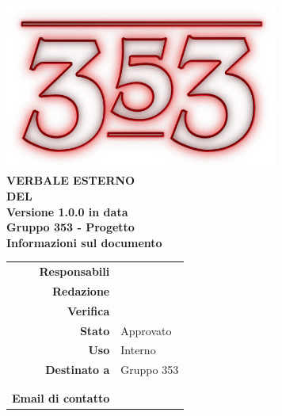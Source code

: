 \documentclass[openany, a4paper, 12pt]{report}
\begin{document}
\begin{titlepage}
	\centering
	\vfill
	{
		\bfseries
		\vskip2cm
		\includegraphics[width=9cm]{../../common/images/logo.png} \\
		\vfill
		\Huge{VERBALE ESTERNO\\DEL {}}\\
		\vfill
		\Large Versione 1.0.0 in data \\
		\large Gruppo 353 - Progetto \progetto \\
		\vfill
		\normalsize Informazioni sul documento\\
		\begin{table}[htbp]
			\centering
			\renewcommand\arraystretch{1.2}
			\begin{tabular}{r|l}
				\hline
				\textbf{Responsabili}	& \Valentina\\
				
				\textbf{Redazione} 		& \Riccardo \\
				\textbf{Verifica} 		&  \Elena\\	
				
				\textbf{Stato} 			& Approvato\\
				\textbf{Uso}			& Interno\\
				\textbf{Destinato a}   	& Gruppo 353\\
										& \Vardanega\\
										& \Cardin\\
				
				\textbf{Email di contatto}	& \mailgroup
			\end{tabular}
		\end{table}
		\vfill 
	}    
\end{titlepage}

\tableofcontents
\newpage
{}

 
\end{document}
